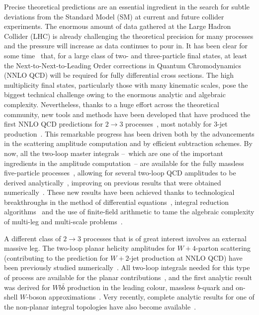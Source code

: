 \documentclass[main.tex]{subfiles}
\begin{document}
Precise theoretical predictions are an essential ingredient in the search for subtle deviations from
the Standard Model (SM) at current and future collider experiments. The enormous amount of data
gathered at the Large Hadron Collider (LHC) is already challenging the theoretical precision for
many processes and the pressure will increase as data continues to pour in. It has been clear for
some time~\cite{Badger:2016bpw,Bendavid:2018nar,Amoroso:2020lgh} that, for a large class of two- and three-particle final states, at least the
Next-to-Next-to-Leading Order corrections in Quantum Chromodynamics (NNLO QCD) will be required for
fully differential cross sections. The high multiplicity final states, particularly those with many kinematic
scales, pose the biggest technical challenge owing to the enormous analytic and algebraic
complexity. Nevertheless, thanks to a huge effort across the theoretical community, new tools and
methods have been developed that have produced the first NNLO QCD predictions for $2\to3$
processes~\cite{Chawdhry:2019bji,Kallweit:2020gcp,Chawdhry:2021hkp}, most notably for 3-jet
production~\cite{Czakon:2021mjy}. This remarkable progress has been driven both by the advancements
in the scattering amplitude computation and by efficient subtraction schemes. By now, all the
two-loop master integrals --~which are one of the important ingredients in the amplitude
computation~-- are available for the fully massless five-particle
processes~\cite{Papadopoulos:2015jft,Gehrmann:2018yef,Abreu:2018rcw,Chicherin:2018mue,Chicherin:2018old,Chicherin:2020oor},
allowing for several two-loop QCD amplitudes to be derived
analytically~\cite{Gehrmann:2015bfy,Badger:2018enw,Abreu:2018zmy,Abreu:2019odu,Badger:2019djh,Abreu:2020cwb,Chawdhry:2020for,Agarwal:2021grm,Abreu:2021fuk,Chawdhry:2021mkw,Agarwal:2021vdh,Badger:2021imn}, improving on previous results that were obtained
numerically~\cite{Badger:2017jhb,Abreu:2017hqn,Badger:2018gip,Abreu:2018jgq}. These new results have
been achieved thanks to technological breakthroughs in the method of differential
equations~\cite{Kotikov:1990kg,Bern:1993kr,Remiddi:1997ny,Gehrmann:1999as,Henn:2013pwa}, integral
reduction algorithms~\cite{Gluza:2010ws,Schabinger:2011dz,Ita:2015tya,Larsen:2015ped,Boehm:2017wjc}
and the use of finite-field arithmetic to tame the algebraic complexity of multi-leg and multi-scale
problems~\cite{vonManteuffel:2014ixa,Peraro:2016wsq,Klappert:2019emp,Peraro:2019svx,Klappert:2020aqs,Klappert:2020nbg}.

A different class of $2\to 3$ processes that is of great interest involves an external massive leg.
The two-loop planar helicity amplitudes for $W+4$-parton scattering (contributing to the prediction
for $W+2$-jet production at NNLO QCD) have been previously studied numerically~\cite{Hartanto:2019uvl}. 
All two-loop integrals needed for this type of process are available for the planar
contributions~\cite{Papadopoulos:2015jft,Abreu:2020jxa,Canko:2020ylt,Syrrakos:2020kba}, and the
first analytic result was derived for $Wb\bar{b}$ production in the leading colour, massless
$b$-quark and on-shell $W$-boson approximations~\cite{Badger:2021nhg}. 
Very recently, complete analytic results for one of the non-planar integral topologies have also become available~\cite{Papadopoulos:2019iam,abreu2021twoloop}.
\end{document}
